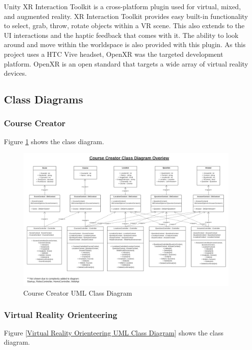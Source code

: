 Unity XR Interaction Toolkit is a cross-platform plugin used for virtual, mixed, and augmented reality. XR Interaction Toolkit provides easy built-in functionality to select, grab, throw, rotate objects within a VR scene. This also extends to the UI interactions and the haptic feedback that comes with it. The ability to look around and move within the worldspace is also provided with this plugin. As this project uses a HTC Vive headset, OpenXR was the targeted development platform. OpenXR is an open standard that targets a wide array of virtual reality devices.

\subsection{Class Diagrams}

\subsubsection{Course Creator}

Figure \ref{Course Creator UML Class Diagram} shows the class diagram.

\begin{figure}[htb]
	\centering
	\includegraphics[width=.9\textwidth]{Design/assets/course-creator-class-diagram.png}
	\caption[Course Creator UML Class Diagram]{\label{Course Creator UML Class Diagram}Course Creator UML Class Diagram}
\end{figure}

\subsubsection{Virtual Reality Orienteering}

Figure \ref{Virtual Reality Orienteering UML Class Diagram} shows the class diagram.

